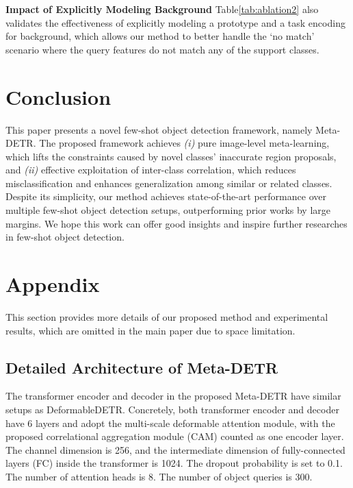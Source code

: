 \documentclass[letterpaper]{article} \usepackage{aaai22}  \usepackage{times}  \usepackage{helvet}  \usepackage{courier}  \usepackage[hyphens]{url}  \usepackage{graphicx} \urlstyle{rm} \def\UrlFont{\rm}  \usepackage{natbib}  \usepackage{caption} \DeclareCaptionStyle{ruled}{labelfont=normalfont,labelsep=colon,strut=off} \frenchspacing  \setlength{\pdfpagewidth}{8.5in}  \setlength{\pdfpageheight}{11in}  \usepackage{algorithm}
\begin{document}
\smallskip
\vspace{+0.5mm}
\noindent\textbf{Impact of Explicitly Modeling Background\;\;}
Table\;\ref{tab:ablation2} also validates the effectiveness of explicitly modeling a prototype and a task encoding for background, which allows our method to better handle the `no match' scenario where the query features do not match any of the support classes.





\section{Conclusion}

This paper presents a novel few-shot object detection framework, namely Meta-DETR. The proposed framework achieves \textit{(i)} pure image-level meta-learning, which lifts the constraints caused by novel classes' inaccurate region proposals, and \textit{(ii)} effective exploitation of inter-class correlation, which reduces misclassification and enhances generalization among similar or related classes. Despite its simplicity, our method achieves state-of-the-art performance over multiple few-shot object detection setups, outperforming prior works by large margins. We hope this work can offer good insights and inspire further researches in few-shot object detection.

\clearpage
{

}



\clearpage

\section{Appendix}

This section provides more details of our proposed method and experimental results, which are omitted in the main paper due to space limitation. 

\subsection{Detailed Architecture of Meta-DETR}

The transformer encoder and decoder in the proposed Meta-DETR have similar setups as Deformable\;DETR\;\cite{DeformableDETR}. Concretely, both transformer encoder and decoder have 6 layers and adopt the multi-scale deformable attention module, with the proposed correlational aggregation module (CAM) counted as one encoder layer. The channel dimension  is 256, and the intermediate dimension of fully-connected layers (FC) inside the transformer is 1024. The dropout probability is set to 0.1. The number of attention heads is 8. The number of object queries  is 300.
\end{document}
